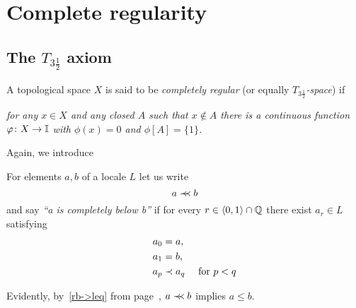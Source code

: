 \chapter{Complete regularity}

\section{The $T_{3\frac{1}{2}}$ axiom}

\begin{framed}
  \begin{df}[$T_{3\frac{1}{2}}$]
    A topological space $X$ is said to be \emph{completely regular\/} (or
    equally \emph{$T_{3\frac{1}{2}}$-space\/}) if
    \begin{center} \it
      for any $x\in X$ and any closed $A$ such that $x\not\in A$ there is a
      continuous function $\varphi\colon X \to \mathbb{I}$ with $\phi(x) = 0$ and $\phi[A]
      = \{1\}$.
    \end{center}
  \end{df}
\end{framed}

Again, we introduce

\begin{framed}
  \begin{nota}[$\cb$]
    For elements $a, b$ of a locale $L$ let us write
    \[
      a \prec\mkern-7mu\prec b
    \]
    and say \emph{``a is completely below b''\/} if for every $r\in \langle 0,
    1 \rangle \cap \mathbb{Q}$ there exist $a_r\in L$ satisfying
    \begin{align*}
      a_0 &= a, \\
      a_1 &= b, \\
      \qquad a_p &\prec a_q \quad \text{ for } p < q
    \end{align*}
  \end{nota}
\end{framed}

\begin{rem}
  Evidently, by~\ref{rb->leq} from page~\pageref{rb->leq}\thinspace, $a \prec\mkern-7mu\prec b$
  implies $a \le b$.
\end{rem}

